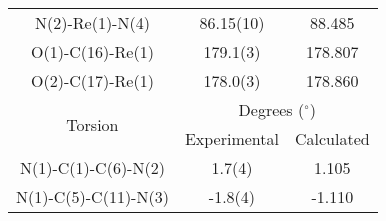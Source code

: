 \begin{table}[htbp]
\begin{tabular}{ccc}
    N(2)-Re(1)-N(4) & 86.15(10) & 88.485 \\
    O(1)-C(16)-Re(1) & 179.1(3) & 178.807 \\
    O(2)-C(17)-Re(1) & 178.0(3) & 178.860 \\\midrule
    \multirow{2}{*}{Torsion} & \multicolumn{2}{c}{Degrees ($^\circ$)} \\ \cline{2-3}
     & Experimental & Calculated \\ \midrule
    N(1)-C(1)-C(6)-N(2) & 1.7(4) & 1.105 \\
    N(1)-C(5)-C(11)-N(3) & -1.8(4) & -1.110 \\
    \bottomrule
    \end{tabular}%
  \label{tab.da8}%
\end{table}%

